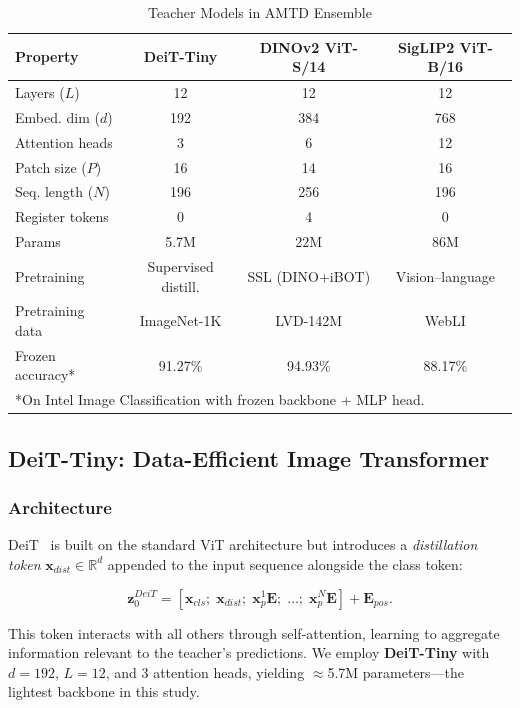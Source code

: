 \documentclass[journal]{IEEEtran}
\begin{document}
\begin{table}[!t]
\renewcommand{\arraystretch}{1.3}
\caption{Teacher Models in AMTD Ensemble}
\label{tab:teachers}
\centering
\begin{tabular}{lccc}
\toprule
\textbf{Property} & \textbf{DeiT-Tiny} & \textbf{DINOv2 ViT-S/14} & \textbf{SigLIP2 ViT-B/16} \\
\midrule
Layers ($L$)        & 12    & 12    & 12    \\
Embed. dim ($d$)    & 192   & 384   & 768   \\
Attention heads     & 3     & 6     & 12    \\
Patch size ($P$)    & 16    & 14    & 16    \\
Seq. length ($N$)   & 196   & 256   & 196   \\
Register tokens     & 0     & 4     & 0     \\
Params              & 5.7M  & 22M   & 86M   \\
Pretraining         & Supervised distill. & SSL (DINO+iBOT) & Vision--language \\
Pretraining data    & ImageNet-1K & LVD-142M & WebLI \\
Frozen accuracy*    & 91.27\% & 94.93\% & 88.17\% \\
\bottomrule
\multicolumn{4}{l}{*On Intel Image Classification with frozen backbone + MLP head.}
\end{tabular}
\end{table}

\subsection{DeiT-Tiny: Data-Efficient Image Transformer}

\subsubsection{Architecture}

DeiT~\cite{touvron2021deit} is built on the standard ViT architecture but introduces a
\textit{distillation token} $\mathbf{x}_{dist} \in \mathbb{R}^d$ appended to the input sequence
alongside the class token:

\begin{equation}
    \mathbf{z}_0^{DeiT} = [\mathbf{x}_{cls};\; \mathbf{x}_{dist};\;
    \mathbf{x}_p^1\mathbf{E};\; \ldots;\; \mathbf{x}_p^N\mathbf{E}] + \mathbf{E}_{pos}.
\end{equation}

This token interacts with all others through self-attention, learning to aggregate information
relevant to the teacher's predictions. We employ \textbf{DeiT-Tiny} with $d=192$, $L=12$, and
3 attention heads, yielding $\approx$5.7M parameters---the lightest backbone in this study.
\end{document}
